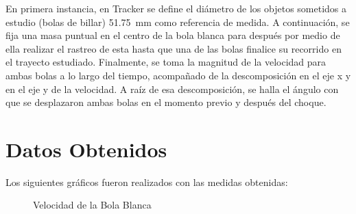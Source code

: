 \documentclass{article}
\begin{document}
En primera instancia, en Tracker se define el diámetro de los objetos sometidos a estudio (bolas de billar)  \qty{51.75}{mm} como referencia de medida. A continuación, se fija una masa puntual en el centro de la bola blanca para después por medio de ella realizar el rastreo de esta hasta que una de las bolas finalice su recorrido en el trayecto estudiado. Finalmente, se toma la magnitud de la velocidad para ambas bolas a lo largo del tiempo, acompañado de la descomposición en el eje x y en el eje y de la velocidad. A raíz de esa descomposición, se halla el ángulo con que se desplazaron ambas bolas en el momento previo y después del choque. 

\section{Datos Obtenidos}

Los siguientes gráficos fueron realizados con las medidas obtenidas:

\begin{figure}[h!]
\centering
{}
\label{fig:vb}
\caption{Velocidad de la Bola Blanca}
\end{figure}
\end{document}
